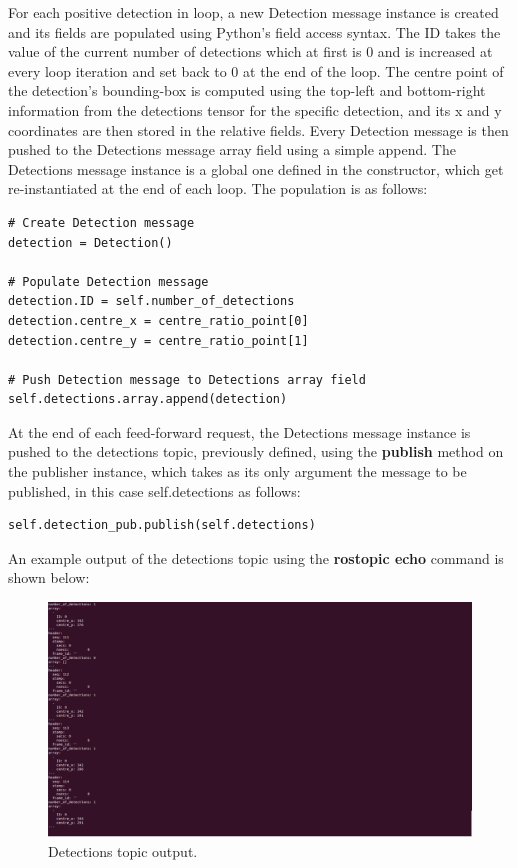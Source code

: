 For each positive detection in loop, a new Detection message instance is created and its fields are populated using Python's field access syntax. The ID takes the value of the current number of detections which at first is 0 and is increased at every loop iteration and set back to 0 at the end of the loop. The centre point of the detection's bounding-box is computed using the top-left and bottom-right information from the detections tensor for the specific detection, and its x and y coordinates are then stored in the relative fields. Every Detection message is then pushed to the Detections message array field using a simple append. The Detections message instance is a global one defined in the constructor, which get re-instantiated at the end of each loop. The population is as follows:

\begin{lstlisting}
# Create Detection message
detection = Detection()

# Populate Detection message
detection.ID = self.number_of_detections
detection.centre_x = centre_ratio_point[0]
detection.centre_y = centre_ratio_point[1]

# Push Detection message to Detections array field
self.detections.array.append(detection)
\end{lstlisting}

At the end of each feed-forward request, the Detections message instance is pushed to the detections topic, previously defined, using the \textbf{publish} method on the publisher instance, which takes as its only argument the message to be published, in this case self.detections as follows:

\begin{lstlisting}
self.detection_pub.publish(self.detections)
\end{lstlisting}

An example output of the detections topic using the \textbf{rostopic echo} command is shown below:

\begin{figure}[!htbp]
  \begin{center}
    \includegraphics[width=.9\linewidth]{images/chapter3_detections_topic.png}
  \end{center}
  \caption{Detections topic output.}
  \label{fig:det_topic}
\end{figure}

